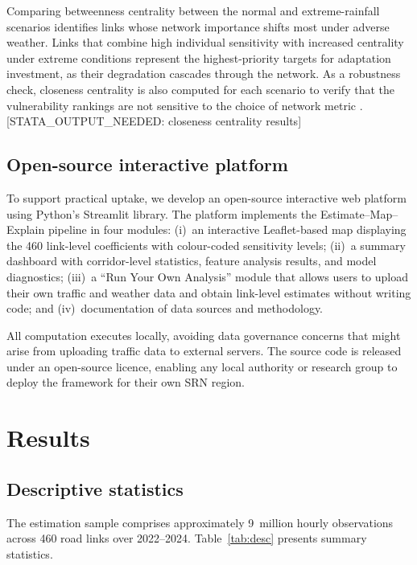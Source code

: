 \documentclass[review]{elsarticle}
\begin{document}
Comparing betweenness centrality between the normal and extreme-rainfall scenarios identifies links whose network importance shifts most under adverse weather. Links that combine high individual sensitivity with increased centrality under extreme conditions represent the highest-priority targets for adaptation investment, as their degradation cascades through the network. As a robustness check, closeness centrality is also computed for each scenario to verify that the vulnerability rankings are not sensitive to the choice of network metric \citep{ganin2017resilience}. [STATA\_OUTPUT\_NEEDED: closeness centrality results]


\subsection{Open-source interactive platform}
\label{sec:method:platform}

To support practical uptake, we develop an open-source interactive web platform using Python's Streamlit library. The platform implements the Estimate--Map--Explain pipeline in four modules: (i)~an interactive Leaflet-based map displaying the 460 link-level coefficients with colour-coded sensitivity levels; (ii)~a summary dashboard with corridor-level statistics, feature analysis results, and model diagnostics; (iii)~a ``Run Your Own Analysis'' module that allows users to upload their own traffic and weather data and obtain link-level estimates without writing code; and (iv)~documentation of data sources and methodology.

All computation executes locally, avoiding data governance concerns that might arise from uploading traffic data to external servers. The source code is released under an open-source licence, enabling any local authority or research group to deploy the framework for their own SRN region.


\section{Results}
\label{sec:results}

\subsection{Descriptive statistics}
\label{sec:results:desc}

The estimation sample comprises approximately 9~million hourly observations across 460 road links over 2022--2024. Table~\ref{tab:desc} presents summary statistics.
\end{document}
